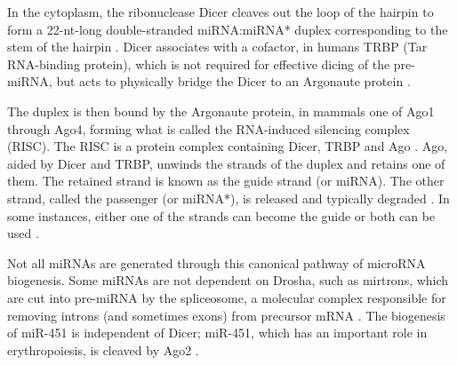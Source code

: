 In the cytoplasm, the ribonuclease Dicer cleaves out the loop of the hairpin
to form a 22-nt-long double-stranded miRNA:miRNA* duplex corresponding to
the stem of the hairpin \citep{Bernstein2001}.
Dicer associates with a cofactor, in humans TRBP (Tar RNA-binding protein),
which is not required for effective dicing of the pre-miRNA,
but acts to physically bridge the Dicer to an Argonaute protein
\citep{Chendrimada2005}.

The duplex is then bound by the Argonaute protein, in mammals one of Ago1
through Ago4, forming what is called the RNA-induced silencing complex (RISC).
The RISC is a protein complex containing Dicer, TRBP and Ago \citep{Gregory2005}.
Ago, aided by Dicer and TRBP, unwinds the strands of the duplex and retains one of
them. The retained strand is known as the guide strand (or miRNA). The other
strand, called the passenger (or miRNA*), is released and typically degraded \citep{Du2005}.
In some instances, either one of the strands can become the guide
or both can be used \citep{Czech2009}.

Not all miRNAs are generated through this canonical pathway of microRNA
biogenesis. Some miRNAs are not dependent on Drosha, such as mirtrons, which
are cut into pre-miRNA by the spliceosome, a molecular complex responsible for
removing introns (and sometimes exons) from precursor mRNA \citep{Ruby2007}. The
biogenesis of miR-451 is independent of Dicer; miR-451, which
has an important role in erythropoiesis, is cleaved by Ago2 \citep{Cheloufi2010}.

